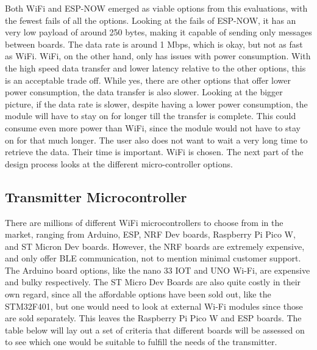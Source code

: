 \documentclass[class=report,11pt,crop=false]{standalone}
\begin{document}
Both WiFi and ESP-NOW emerged as viable options from this evaluations, with the fewest fails of all the options. Looking at the fails of ESP-NOW, it has an very low payload of around 250 bytes, making it capable of sending only messages between boards. The data rate is around 1 Mbps, which is okay, but not as fast as WiFi. 
WiFi, on the other hand, only has issues with power consumption. With the high speed data transfer and lower latency relative to the other options, this is an acceptable trade off. While yes, there are other options that offer lower power consumption, the data transfer is also slower. Looking at the bigger picture, if the data rate is slower, despite having a lower power consumption, the module will have to stay on for longer till the transfer is complete. This could consume even more power than WiFi, since the module would not have to stay on for that much longer. 
The user also does not want to wait a very long time to retrieve the data. Their time is important. WiFi is chosen. The next part of the design process looks at the different micro-controller options. 

\subsection{Transmitter Microcontroller}

There are millions of different WiFi microcontrollers to choose from in the market, ranging from Arduino, ESP, NRF Dev boards, Raspberry Pi Pico W, and ST Micron Dev boards. However, the NRF boards are extremely expensive, and only offer BLE communication, not to mention minimal customer support. The Arduino board options, like the nano 33 IOT and UNO Wi-Fi, are expensive and bulky respectively. The ST Micro Dev Boards are also quite costly in their own regard, since all the affordable options have been sold out, like the STM32F401, but one would need to look at external Wi-Fi modules since those are sold separately. This leaves the Raspberry Pi Pico W and ESP boards. The table below will lay out a set of criteria that different boards will be assessed on to see which one would be suitable to fulfill the needs of the transmitter.
\end{document}
